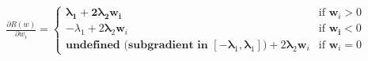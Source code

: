 \documentclass[preview]{standalone}
\begin{document}
\begin{align*}
\frac{\partial R(w)}{\partial w_i} =\begin{cases}\boldsymbol{\lambda}_\textbf{1} + \textbf{2}\boldsymbol{\lambda}_\textbf{2} \mathbf{w_i} & \text{if } \mathbf{w}_i > 0 \\-\lambda_1 + 2\mathbf{\lambda}_2 \mathbf{w}_i & \text{if } \mathbf{w_i} < 0 \\\textbf{undefined (subgradient in } [-\boldsymbol{\lambda}_1, \boldsymbol{\lambda}_1]\textbf{)} + 2\mathbf{\lambda}_2 \mathbf{w}_i & \text{if } \mathbf{w}_i = 0\end{cases}
\end{align*}
\end{document}
